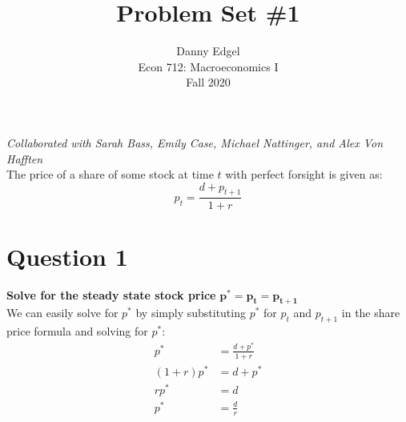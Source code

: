 \documentclass{article}
\begin{document}
\title{	Problem Set \#1 }
\author{ 	Danny Edgel 					\\ 
			Econ 712: Macroeconomics I		\\
			Fall 2020						\\
		}
\maketitle\thispagestyle{empty}


\textit{Collaborated with Sarah Bass, Emily Case, Michael Nattinger, and Alex Von Hafften}
\medskip \\
The price of a share of some stock at time $t$ with perfect forsight is given as:
\[
	p_t=\frac{d+p_{t+1}}{1+r}
\]



\section*{Question 1}
\textbf{Solve for the steady state stock price} $\mathbf{p^*=p_t=p_{t+1}}$
\medskip \\
We can easily solve for $p^*$ by simply substituting $p^*$ for $p_t$ and $p_{t+1}$ in the share price formula and solving for $p^*$:
\begin{align*}
	p^* 		&= \frac{d + p^*}{1+r} \\
	(1+r)p^* 	&= d + p^*				\\
	rp^*		&= d 					\\
	p^*			&= \frac{d}{r}
\end{align*}


\end{document}
